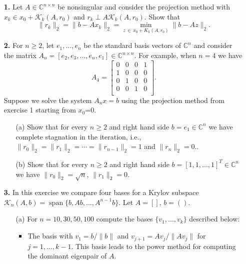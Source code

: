 \documentclass[10pt]{report}
\begin{document}
\begin{enumerate}
\item[\textbf{1.}] Let $A \in \mathbb{C}^{n \times n}$ be nonsingular and consider the projection method with $x_k \in x_0 + \mathcal{K}_k(A,r_0)$ and \linebreak $r_k \perp A \mathcal{K}_k(A,r_0)$. Show that \[\|r_{k}\|_2=\|b-Ax_k\|_2=\min_{z \,\in \, x_0+K_k(A,r_0)}\|b-Az\|_2.\]


\vspace{0.1cm} 

\item[\textbf{2.}] For $n \geq 2$, let  $e_1, \ldots, e_n$ be the standard basis vectors of $\mathbb{C}^n$ and consider the matrix 
$A_n=[e_2,e_3,\ldots ,e_n,e_1] \in \mathbb{C}^{n \times n}$. For example, when $n=4$ we have
\[  A_4 = \left[\begin{array}{cccc}
0 & 0 & 0 & 1 \\ 
1 & 0 & 0 & 0 \\
0 & 1 & 0 & 0 \\
0 & 0 & 1 & 0 \\
\end{array} \right].\]
Suppose we solve the system $A_nx=b$ using the projection method from exercise 1 starting from $x_0$=0.
\begin{enumerate}
\item[(a)] Show that for every $n \geq 2$ and right hand side $b=e_1 \in \mathbb{C}^n$ we have complete stagnation in the iteration, i.e., $\|r_0\|_2 = \|r_1\|_2=\cdots =\|r_{n-1}\|_2=1$ and $\|r_n\|_2=0.$.
\item[(b)] Show that for every $n \geq 2$ and right hand side $b=[1, 1, \ldots, 1]^T \in \mathbb{C}^n$ we have $\|r_0\|_2=\sqrt{n}$, $\|r_1\|_2=0.$
\end{enumerate}  

\item[\textbf{3.}] In this exercise we compare four bases for a Krylov subspace $\mathcal{K}_n(A,b)= \operatorname{span}\{b, Ab, \ldots, A^{n-1}b\}$. Let $A=[]$, $b=()$. 

\begin{itemize}
\item[(a)] For $n= 10, 30, 50, 100$ compute the bases $\{v_1, \ldots,v_k\}$ described below:
\begin{itemize}
\item The basis with $v_1=b/\|b\|$ and $v_{j+1}=Av_j/\|Av_j\|$ for $j=1, \ldots, k-1$. This basis leads to the power method for computing the dominant eigenpair of $A$.


\end{itemize}
\end{itemize}
\end{enumerate}
\end{document}
